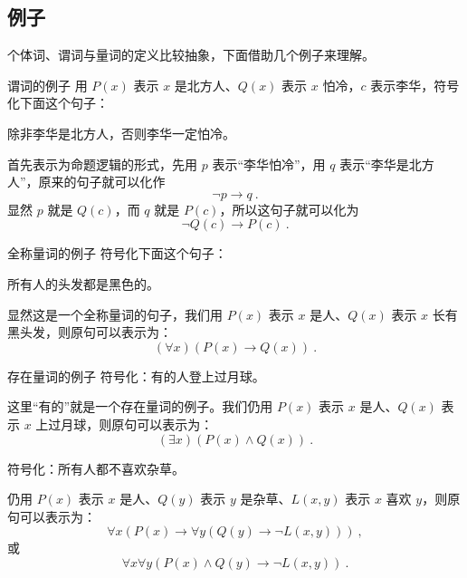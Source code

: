 \subsection{例子}
个体词、谓词与量词的定义比较抽象，下面借助几个例子来理解。

\begin{example}{谓词的例子}
用 $P(x)$ 表示 $x$ 是北方人、$Q(x)$ 表示 $x$ 怕冷，$c$ 表示李华，符号化下面这个句子：

除非李华是北方人，否则李华一定怕冷。
\end{example}
首先表示为命题逻辑的形式，先用 $p$ 表示“李华怕冷”，用 $q$ 表示“李华是北方人”，原来的句子就可以化作
\begin{equation}
\neg p \to  q ~.
\end{equation}
显然 $p$ 就是 $Q(c)$，而 $q$ 就是 $P(c)$，所以这句子就可以化为
\begin{equation}
\neg Q(c) \to  P(c) ~.
\end{equation}

\begin{example}{全称量词的例子}
符号化下面这个句子：

所有人的头发都是黑色的。
\end{example}
显然这是一个全称量词的句子，我们用 $P(x)$ 表示 $x$ 是人、$Q(x)$ 表示 $x$ 长有黑头发，则原句可以表示为：
\begin{equation}
(\forall x)(P(x) \to Q(x)) ~.
\end{equation}

\begin{example}{存在量词的例子}
符号化：有的人登上过月球。
\end{example}
这里“有的”就是一个存在量词的例子。我们仍用 $P(x)$ 表示 $x$ 是人、$Q(x)$ 表示 $x$ 上过月球，则原句可以表示为：
\begin{equation}
(\exists x)(P(x) \land Q(x)) ~.
\end{equation}

\begin{example}{}
符号化：所有人都不喜欢杂草。
\end{example}
仍用 $P(x)$ 表示 $x$ 是人、$Q(y)$ 表示 $y$ 是杂草、$L(x, y)$ 表示 $x$ 喜欢 $y$，则原句可以表示为：
\begin{equation}
\forall x(P(x) \to \forall y(Q(y) \to \neg L(x, y))) ~,
\end{equation}
或
\begin{equation}
\forall x \forall y (P(x) \land Q(y) \to \neg L(x, y)) ~.
\end{equation}





